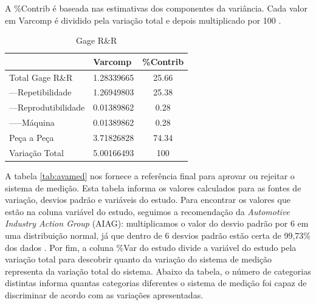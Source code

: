 \documentclass[
12pt,					%
openright,				%
oneside,				%
a4paper,				%
english,
brazil
]{ABNT/abntex2_report}
\begin{document}
A \%Contrib  é baseada nas estimativas dos componentes da variância. Cada valor em Varcomp é dividido pela variação total e depois multiplicado por 100 \cite{estudos_rr}.  

\begin{table}[H]
	\caption{Gage R\&R}
	\centering
	\begin{tabular}{lcc}
										   & \multicolumn{1}{l}{Varcomp} & \multicolumn{1}{l}{\%Contrib} \\ \hline
	\multicolumn{1}{l|}{Total Gage R\&R}   & 1.28339665                  & 25.66                         \\
	\multicolumn{1}{l|}{---Repetibilidade}    & 1.26949803                  & 25.38                         \\
	\multicolumn{1}{l|}{---Reprodutibilidade} & 0.01389862                  & 0.28                          \\
	\multicolumn{1}{l|}{-----Máquina}           & 0.01389862                  & 0.28                          \\
	\multicolumn{1}{l|}{Peça a Peça}      & 3.71826828                  & 74.34                         \\
	\multicolumn{1}{l|}{Variação Total}    & 5.00166493                  & 100                          
	\end{tabular}
	\label{tab:gagerr}
\end{table}

A tabela \ref{tab:avamed} nos fornece a referência final para aprovar ou rejeitar o sistema de medição. Esta tabela informa os valores calculados para as fontes de variação, desvios padrão e variáveis do estudo. Para encontrar os valores que estão na coluna variável do estudo, seguimos a recomendação da \textit{Automotive Industry Action Group }(AIAG): multiplicamos o valor do desvio padrão por 6 em uma distribuição normal, já que dentro de 6 desvios padrão estão certa de 99,73\% dos dados \cite{estudos_rr}. Por fim, a coluna \%Var do estudo divide a variável do estudo pela variação total para descobrir quanto da variação do sistema de medição representa da variação total do sistema. Abaixo da tabela, o número de categorias distintas informa quantas categorias diferentes o sistema de medição foi capaz de discriminar de acordo com as variações apresentadas.  
\end{document}
